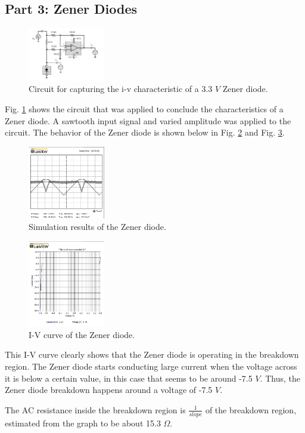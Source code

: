 \documentclass[letterpaper, 10 pt, conference]{ieeeconf}  %
\begin{document}
\subsection{Part 3: Zener Diodes}
\begin{figure}[ht]
  \centering
  \includegraphics[width=0.3\textwidth]{images/zener_circuit.png}
  \caption{Circuit for capturing the i-v characteristic of a 3.3 $V$ Zener diode.}
  \label{fig:zener_1}
\end{figure}
Fig. \ref{fig:zener_1} shows the circuit that was applied to conclude the characteristics of
a Zener diode. A sawtooth input signal and varied amplitude was applied to the circuit. The behavior
of the Zener diode is shown below in Fig. \ref{fig:zener_2} and Fig. \ref{fig:zener_3}.
\begin{figure}[h]
  \centering
  \includegraphics[width=0.3\textwidth]{images/zener_simu.png}
  \caption{Simulation results of the Zener diode.}
  \label{fig:zener_2}
\end{figure}
\begin{figure}[h]
  \centering
  \includegraphics[width=0.3\textwidth]{images/zener_iv.png}
  \caption{I-V curve of the Zener diode.}
  \label{fig:zener_3}
\end{figure}
\clearpage
This I-V curve clearly shows that the Zener diode is operating in the breakdown region.
The Zener diode starts conducting large current when the voltage across it is below
a certain value, in this case that seems to be around -7.5 $V$.
Thus, the Zener diode breakdown happens around a voltage of -7.5 $V$.
\par The AC resistance inside the breakdown region is $\frac{1}{slope}$ of the breakdown region,
estimated from the graph to be about 15.3 $\Omega$.
\end{document}
